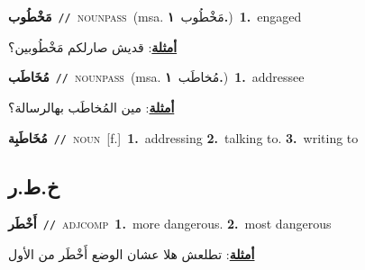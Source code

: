 \documentclass[10pt,a4paper,twoside]{article} %
\begin{document}
\begin{multicols}{2}
{\setlength\topsep{0pt}\textbf{\foreignlanguage{arabic}{مَخْطُوب}}\ {\color{gray}\texttt{//}\color{black}}\ \textsc{noun\textunderscore pass}\ \color{gray}(msa. \foreignlanguage{arabic}{مَخْطُوب}~\foreignlanguage{arabic}{\textbf{١.}})\color{black}\ \textbf{1.}~engaged\  \begin{flushright}\color{gray}\foreignlanguage{arabic}{\textbf{\underline{\foreignlanguage{arabic}{أمثلة}}}: قديش صارلكم مَخْطُوبين؟}\end{flushright}\color{black}} \vspace{2mm}

{\setlength\topsep{0pt}\textbf{\foreignlanguage{arabic}{مُخَاطَب}}\ {\color{gray}\texttt{//}\color{black}}\ \textsc{noun\textunderscore pass}\ \color{gray}(msa. \foreignlanguage{arabic}{مُخاطَب}~\foreignlanguage{arabic}{\textbf{١.}})\color{black}\ \textbf{1.}~addressee\  \begin{flushright}\color{gray}\foreignlanguage{arabic}{\textbf{\underline{\foreignlanguage{arabic}{أمثلة}}}: مين المُخاطَب بهالرسالة؟}\end{flushright}\color{black}} \vspace{2mm}

{\setlength\topsep{0pt}\textbf{\foreignlanguage{arabic}{مُخَاطَبِة}}\ {\color{gray}\texttt{//}\color{black}}\ \textsc{noun}\ [f.]\ \textbf{1.}~addressing  \textbf{2.}~talking to.  \textbf{3.}~writing to\ } \vspace{2mm}

\vspace{-3mm}
\subsection*{\color{blue}\foreignlanguage{arabic}{خ.ط.ر}\color{blue}{}} 

{\setlength\topsep{0pt}\textbf{\foreignlanguage{arabic}{أَخْطَر}}\ {\color{gray}\texttt{//}\color{black}}\ \textsc{adj\textunderscore comp}\ \textbf{1.}~more dangerous.  \textbf{2.}~most dangerous\  \begin{flushright}\color{gray}\foreignlanguage{arabic}{\textbf{\underline{\foreignlanguage{arabic}{أمثلة}}}: تطلعش هلا عشان الوضع أَخْطَر من الأول}\end{flushright}\color{black}} \vspace{2mm}


\end{multicols}
\end{document}
